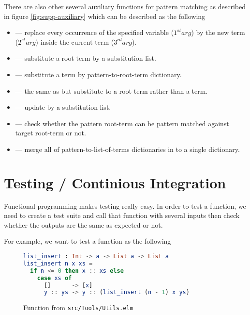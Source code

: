 \documentclass[master.tex]{subfiles}
\begin{document}
There are also other several auxiliary functions for pattern matching as
described in figure \ref{fig:supp-auxiliary} which can be described as the
following
\begin{itemize}
\item {} --- replace every occurrence of the specified variable
  ($1^{st} arg$) by the new term ($2^{st} arg$) inside the current term ($3^{rd}
  arg$).
\item {} --- substitute a root term by a
  substitution list.
\item {} --- substitute a term by
  pattern-to-root-term dictionary.
\item {} --- the same as
   but substitute to a root-term rather than a term.
\item {} --- update
   by a substitution list.
\item {} --- check whether the pattern root-term can be pattern
  matched against target root-term or not.
\item {} --- merge all of
  pattern-to-list-of-terms dictionaries in to a single dictionary.
\end{itemize}

\section{Testing / Continious Integration}
Functional programming makes testing really easy. In order to test a function,
we need to create a test suite and call that function with several inputs then
check whether the outputs are the same as expected or not.

For example, we want to test a function  as the following

\begin{figure}[H]
\begin{framed}
\begin{lstlisting}[language=elm]
list_insert : Int -> a -> List a -> List a
list_insert n x xs =
  if n <= 0 then x :: xs else
    case xs of
      []      -> [x]
      y :: ys -> y :: (list_insert (n - 1) x ys)
\end{lstlisting}
\end{framed}
\caption{Function  from \texttt{src/Tools/Utils.elm}}
\label{fig:implementation-test-src}
\end{figure}
\end{document}
